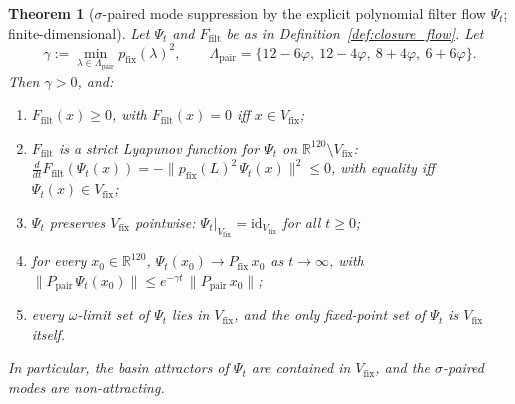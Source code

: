 \documentclass[11pt, a4paper]{amsart}
\newtheorem{theorem}{Theorem}[section]
\theoremstyle{definition}
\newcommand{\R}{\mathbb{R}}
\begin{document}
\begin{theorem}[$\sigma$-paired mode suppression by the explicit polynomial filter flow $\Psi_t$; finite-dimensional]\label{thm:H_attr_finite}
Let $\Psi_t$ and $F_{\mathrm{filt}}$ be as in Definition~\ref{def:closure_flow}.
Let
\[
\gamma := \min_{\lambda \in \Lambda_{\mathrm{pair}}}
   p_{\mathrm{fix}}(\lambda)^2,
\qquad
\Lambda_{\mathrm{pair}} =
\{12-6\varphi,\ 12-4\varphi,\ 8+4\varphi,\ 6+6\varphi\}.
\]
Then $\gamma > 0$, and:
\begin{enumerate}
\item[(i)] $F_{\mathrm{filt}}(x) \ge 0$, with $F_{\mathrm{filt}}(x) = 0$ iff $x \in V_{\mathrm{fix}}$;
\item[(ii)] $F_{\mathrm{filt}}$ is a strict Lyapunov function for $\Psi_t$ on
   $\R^{120}\setminus V_{\mathrm{fix}}$:
   $\frac{d}{dt} F_{\mathrm{filt}}(\Psi_t(x)) = -\|p_{\mathrm{fix}}(L)^2\,\Psi_t(x)\|^2
   \le 0$, with equality iff $\Psi_t(x) \in V_{\mathrm{fix}}$;
\item[(iii)] $\Psi_t$ preserves $V_{\mathrm{fix}}$ pointwise:
   $\Psi_t|_{V_{\mathrm{fix}}} = \mathrm{id}_{V_{\mathrm{fix}}}$ for
   all $t\ge 0$;
\item[(iv)] for every $x_0 \in \R^{120}$,
   $\Psi_t(x_0) \to P_{\mathrm{fix}}\,x_0$ as $t\to\infty$, with
   $\|P_{\mathrm{pair}}\,\Psi_t(x_0)\| \le e^{-\gamma t}\,\|P_{\mathrm{pair}}\,x_0\|$;
\item[(v)] every $\omega$-limit set of $\Psi_t$ lies in $V_{\mathrm{fix}}$,
   and the only fixed-point set of $\Psi_t$ is $V_{\mathrm{fix}}$
   itself.
\end{enumerate}
In particular, the basin attractors of $\Psi_t$ are contained in
$V_{\mathrm{fix}}$, and the $\sigma$-paired modes are non-attracting.
\end{theorem}
\end{document}
